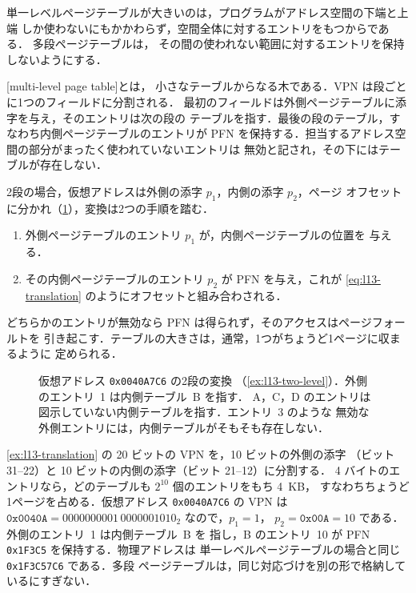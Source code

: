 \documentclass[../main.tex]{subfiles}
\begin{document}
単一レベルページテーブルが大きいのは，プログラムがアドレス空間の下端と上端
しか使わないにもかかわらず，空間全体に対するエントリをもつからである．
多段ページテーブルは，
その間の使われない範囲に対するエントリを保持しないようにする．

\begin{definition}[多段ページテーブル]
  [multi-level page table]とは，
  小さなテーブルからなる木である．VPN は段ごとに1つのフィールドに分割される．
  最初のフィールドは外側ページテーブルに添字を与え，そのエントリは次の段の
  テーブルを指す．最後の段のテーブル，すなわち内側ページテーブルのエントリが
  PFN を保持する．担当するアドレス空間の部分がまったく使われていないエントリは
  無効と記され，その下にはテーブルが存在しない．
\end{definition}

2段の場合，仮想アドレスは外側の添字 $p_1$，内側の添字 $p_2$，ページ
オフセットに分かれ（\cref{fig:l13-two-level}），変換は2つの手順を踏む．
\begin{enumerate}
  \item 外側ページテーブルのエントリ $p_1$ が，内側ページテーブルの位置を
    与える．
  \item その内側ページテーブルのエントリ $p_2$ が PFN を与え，これが
    \cref{eq:l13-translation} のようにオフセットと組み合わされる．
\end{enumerate}
どちらかのエントリが無効なら PFN は得られず，そのアクセスはページフォールトを
引き起こす．テーブルの大きさは，通常，1つがちょうど1ページに収まるように
定められる．

\begin{figure}[htbp]
  \centering
  
  \caption{仮想アドレス \texttt{0x0040A7C6} の2段の変換
    （\cref{ex:l13-two-level}）．外側のエントリ~1 は内側テーブル~B を指す．
    A，C，D のエントリは図示していない内側テーブルを指す．エントリ~3 のような
    無効な外側エントリには，内側テーブルがそもそも存在しない．}
  \label{fig:l13-two-level}
\end{figure}

\begin{example}
  \label{ex:l13-two-level}
  \cref{ex:l13-translation} の 20 ビットの VPN を，10 ビットの外側の添字
  （ビット 31--22）と 10 ビットの内側の添字（ビット 21--12）に分割する．
  4 バイトのエントリなら，どのテーブルも $2^{10}$ 個のエントリをもち 4~KB，
  すなわちちょうど1ページを占める．仮想アドレス \texttt{0x0040A7C6} の VPN は
  $\texttt{0x0040A} = 0000000001\,0000001010_2$ なので，$p_1 = 1$，
  $p_2 = \texttt{0x00A} = 10$ である．外側のエントリ~1 は内側テーブル~B を
  指し，B のエントリ~10 が PFN \texttt{0x1F3C5} を保持する．物理アドレスは
  単一レベルページテーブルの場合と同じ \texttt{0x1F3C57C6} である．多段
  ページテーブルは，同じ対応づけを別の形で格納しているにすぎない．
\end{example}
\end{document}
